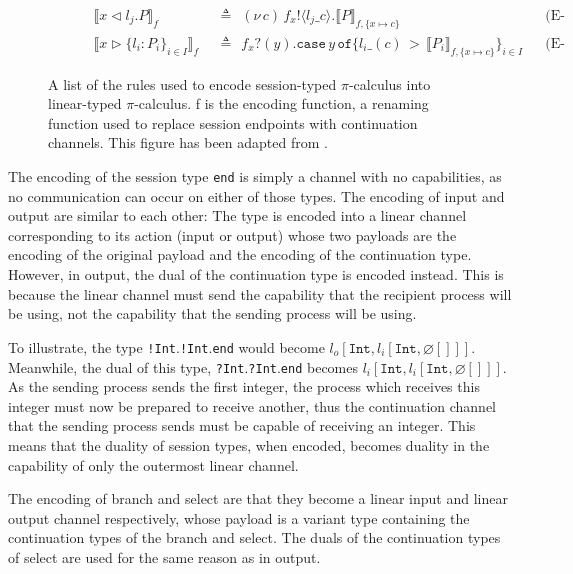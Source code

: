 \documentclass{l4proj}
\begin{document}
\begin{figure}[H]
\begin{subfigure}{\textwidth}
\begin{align*}
\llbracket x \triangleleft l_{j}.P \rrbracket_{f} \:\: &\triangleq \:\: (\nu\,c)\,f_{x}\texttt{!} \langle l_{j}\_c \rangle.\llbracket P \rrbracket_{f,\{x \mapsto c\}} & &\text{(E-Selection)}\\
\llbracket x \triangleright \{l_{i}:P_{i}\}_{i \in I} \rrbracket_{f} \:\: &\triangleq \:\: f_{x}\texttt{?}(y).\texttt{case}\,y\,\texttt{of}\{l_{i}\_(c)\,>\,\llbracket P_{i} \rrbracket_{f,\{x \mapsto c\}}\}_{i \in I} & &\text{(E-Branching)}
\end{align*}
\end{subfigure}
\caption{A list of the rules used to encode session-typed $\pi$-calculus into linear-typed $\pi$-calculus. f is the encoding function, a renaming function used to replace session endpoints with continuation channels. This figure has been adapted from \citet{DARDHA2017253}.}
\label{fig:encRules}
\end{figure}

\quad The encoding of the session type \texttt{end} is simply a channel with no capabilities, as no communication can occur on either of those types. The encoding of input and output are similar to each other: The type is encoded into a linear channel corresponding to its action (input or output) whose two payloads are the encoding of the original payload and the encoding of the continuation type. However, in output, the dual of the continuation type is encoded instead. This is because the linear channel must send the capability that the recipient process will be using, not the capability that the sending process will be using. 

\quad To illustrate, the type \texttt{!Int}.\texttt{!Int}.\texttt{end} would become $l_{o}[\texttt{Int}, l_{i}[\texttt{Int}, \varnothing[]]]$. Meanwhile, the dual of this type, \texttt{?Int}.\texttt{?Int}.\texttt{end} becomes $l_{i}[\texttt{Int}, l_{i}[\texttt{Int}, \varnothing[]]]$. As the sending process sends the first integer, the process which receives this integer must now be prepared to receive another, thus the continuation channel that the sending process sends must be capable of receiving an integer. This means that the duality of session types, when encoded, becomes duality in the capability of only the outermost linear channel.

\quad The encoding of branch and select are that they become a linear input and linear output channel respectively, whose payload is a variant type containing the continuation types of the branch and select. The duals of the continuation types of select are used for the same reason as in output.
\end{document}
